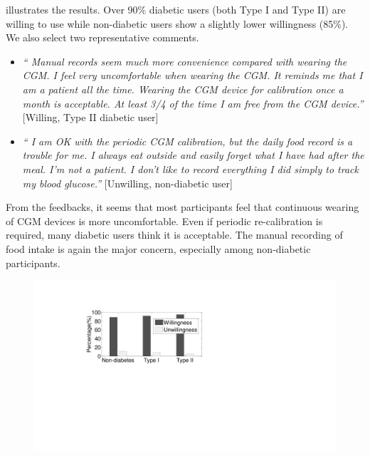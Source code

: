 { illustrates the results.
Over 90\% diabetic users (both Type I and Type II) are willing to use \sysname while non-diabetic users show a slightly lower willingness (85\%).
We also select two representative comments.
\begin{itemize}
  \item 
  \textit{``
  Manual records seem much more convenience compared with wearing the CGM.
  I feel very uncomfortable when wearing the CGM.
  It reminds me that I am a patient all the time.
  Wearing the CGM device for calibration once a month is acceptable. 
  At least 3/4 of the time I am free from the CGM device.''}
  [Willing, Type II diabetic user]
  \item 
  \textit{``
  I am OK with the periodic CGM calibration, but the daily food record is a trouble for me. 
  I always eat outside and easily forget what I have had after the meal. 
  I'm not a patient.
  I don't like to record everything I did simply to track my blood glucose.''}
  [Unwilling, non-diabetic user]
\end{itemize}
From the feedbacks, it seems that most participants feel that continuous wearing of CGM devices is more uncomfortable.
Even if periodic re-calibration is required, many diabetic users think it is acceptable.
The manual recording of food intake is again the major concern, especially among non-diabetic participants.

\begin{figure}[h]
  \centering
  \includegraphics[width=0.4\columnwidth]{./img/willingness.pdf}
  \caption{}
  \label{fig:user_willingness}
\end{figure}


}
